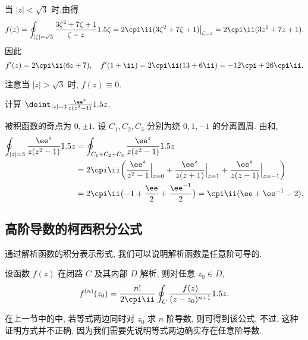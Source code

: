 \begin{solution}
  当 $|z|<\sqrt3$ 时,由\thmCI 得
  \[
     f(z)
    =\oint_{|\zeta|=\sqrt3} \frac{3\zeta^2+7\zeta+1}{\zeta-z}\d \zeta
    =2\cpi\ii (3\zeta^2+7\zeta+1)\big|_{\zeta=z}
    =2\cpi\ii (3z^2+7z+1).
  \]
  因此
  \[
    f'(z)=2\cpi\ii (6z+7),\quad
     f'(1+\ii)
    =2\cpi\ii(13+6\ii)
    =-12\cpi+26\cpi\ii.
  \]
\end{solution}
注意当 $|z|>\sqrt3$ 时, $f(z)\equiv0$.

\begin{example}
  计算 $\doint_{|z|=3}\frac{\ee^z}{z(z^2-1)}\d z$.
\end{example}

\begin{solution}
  被积函数的奇点为 $0,\pm1$.
  设 $C_1,C_2,C_3$ 分别为绕 $0,1,-1$ 的分离圆周.
  由\thmCCC 和\thmCI,
  \begin{align*}
      \oint_{|z|=3}\frac{\ee^z}{z(z^2-1)}\d z&
    =\oint_{C_1+C_2+C_3}\frac{\ee^z}{z(z^2-1)}\d z\\&
    =2\cpi\ii \biggl(\frac{\ee^z}{z^2-1}\Big|_{z=0}
      +\frac{\ee^z}{z(z+1)}\Big|_{z=1}
      +\frac{\ee^z}{z(z-1)}\Big|_{z=-1}\biggr)\\&
    =2\cpi\ii \bigl(-1+\frac\ee2+\frac{\ee^{-1}}2\bigr)=\cpi\ii (\ee+\ee^{-1}-2).
  \end{align*}
\end{solution}


\subsection{高阶导数的柯西积分公式}

通过解析函数的积分表示形式, 我们可以说明\alert{解析函数是任意阶可导的}.

\begin{theorem}[柯西积分公式]
  \label{thm:Cauchy-integral-high-order}
  设函数 $f(z)$ 在闭路 $C$ 及其内部 $D$ 解析, 则对任意 $z_0\in D$,
  \[
    f^{(n)}(z_0)=\frac{n!}{2\cpi\ii}\oint_C\frac{f(z)}{(z-z_0)^{n+1}}\d z.
  \]
\end{theorem}

在上一节中的\thmCI 中, 若等式两边同时对 $z_0$ 求 $n$ 阶导数, 则可得到该公式.
不过, 这种证明方式并不正确, 因为我们需要先说明\thmCI 等式两边确实存在任意阶导数.

